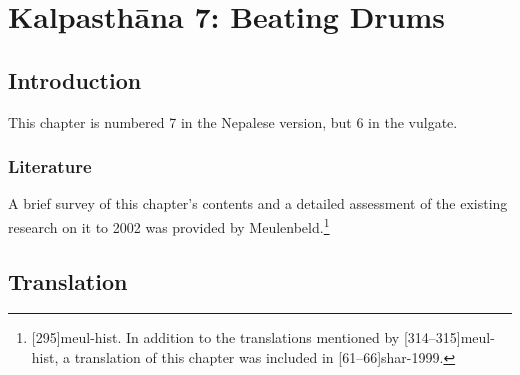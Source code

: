 \chapter{Kalpasthāna 7: Beating Drums}
\label{dundubhi}

\section{Introduction}

This chapter is numbered 7 in the Nepalese version, but 6 in the vulgate.

\subsection{Literature}

A brief survey of this chapter's contents and a detailed assessment
of the existing research on it to 2002 was provided by
Meulenbeld.\footnote{[295]{meul-hist}. In addition to the
    translations mentioned by [314--315]{meul-hist}, a
    translation of this chapter was included in
    [61--66]{shar-1999}.} 
%    

\section{Translation}


